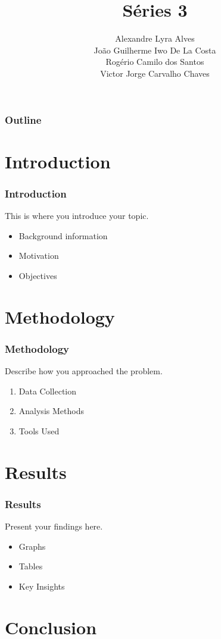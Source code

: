 \documentclass{beamer}
\title[Short Title]{Séries 3}
\author{Alexandre Lyra Alves\\João Guilherme Iwo De La Costa\\Rogério Camilo dos Santos\\Victor Jorge Carvalho Chaves}
\institute{Conexão dos Garfos}
\begin{document}
\frame{\titlepage}

\begin{frame}
\frametitle{Outline}
\tableofcontents
\end{frame}

\section{Introduction}

\begin{frame}
\frametitle{Introduction}
This is where you introduce your topic.

\begin{itemize}
  \item Background information
  \item Motivation
  \item Objectives
\end{itemize}
\end{frame}

\section{Methodology}

\begin{frame}
\frametitle{Methodology}
Describe how you approached the problem.

\begin{enumerate}
  \item Data Collection
  \item Analysis Methods
  \item Tools Used
\end{enumerate}
\end{frame}

\section{Results}

\begin{frame}
\frametitle{Results}
Present your findings here.

\begin{itemize}
  \item Graphs
  \item Tables
  \item Key Insights
\end{itemize}
\end{frame}

\section{Conclusion}
\end{document}
